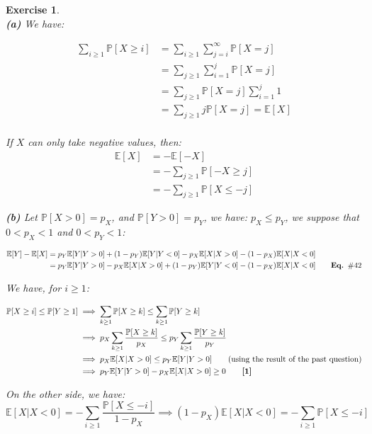 \documentclass{article}
\newtheorem{exo}{Exercise}
\def\P{\mathbb{P}}
\def\E{\mathbb{E}}
\begin{document}
\begin{exo}{\ \\}
\noindent    
\textbf{(a)} We have:

\begin{align*}
    \sum_{i\geq1} \P[X \geq i]
    &= \sum_{i\geq1} \sum_{j = i }^{\infty} \P[X=j] \\
    &= \sum_{j\geq1} \sum_{i=1}^{j} \P[X=j] \\
    &= \sum_{j\geq1} \P[X=j]\sum_{i=1}^{j}1  \\
    &= \sum_{j\geq1} j \P[X=j] = \E[X]\\
\end{align*}

If $X$ can only take negative values, then: 
\begin{align*}
    \E[X] 
    &= -\E[-X] \\
    &= -\sum_{j \geq 1} \P[-X \geq j] \\
    &= -\sum_{j \geq 1} \P[X \leq -j]
\end{align*}



\noindent    
\textbf{(b)} Let $\P[X > 0] = p_X$, and $\P[Y > 0] = p_Y$, we have: $p_X \leq p_Y$, we suppose that $0 < p_X < 1$ and $ 0 <  p_Y < 1$:

\begin{align*}
    \E[Y]-\E[X] 
    &= p_Y \E[Y|Y>0] + (1-p_Y)\E[Y|Y<0] -
    p_X \E[X|X>0] - (1-p_X)\E[X|X<0] \\
    &= p_Y \E[Y|Y>0] - p_X \E[X|X>0] 
    +(1-p_Y)\E[Y|Y<0] -  (1-p_X)\E[X|X<0] 
    \quad \quad \text{\textbf{Eq. $\#42$}}
\end{align*}

We have, for $i \geq 1$:

\begin{align*}
    \P[X\geq i] \leq \P[Y \geq 1] 
    &\implies \sum_{k \geq 1} \P[X\geq k] \leq \sum_{k \geq 1} \P[Y \geq k]\\
    &\implies p_X \sum_{k \geq 1}  \frac{\P[X\geq k]}{p_X}
    \leq  p_Y \sum_{k \geq 1} \frac{\P[Y \geq k]}{p_Y} \\
    &\implies  p_X \E[X | X>0] \leq p_Y \E[Y | Y>0]
    \quad \quad \text{(using the result of the past question)}  \\
    &\implies p_Y \E[Y | Y>0] - p_X \E[X | X>0] \geq 0 \quad \quad  \text{\textbf{[1]}}
\end{align*}

On the other side, we have:
\[
    \E[X|X<0] = -\sum_{i \geq 1} \frac{\P[X \leq -i]}{1-p_X} \implies 
    (1-p_X) \E[X|X<0] = -\sum_{i \geq 1} \P[X \leq -i]
\]


\end{exo}
\end{document}
